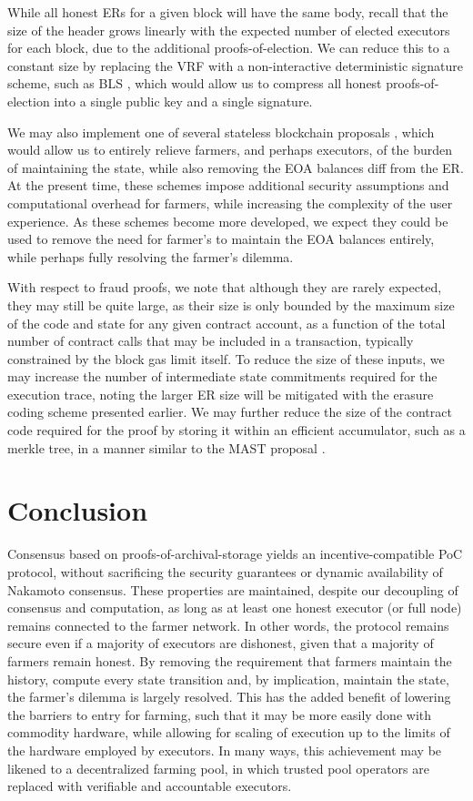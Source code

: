 \documentclass[conference]{IEEEtran}
\begin{document}
While all honest ERs for a given block will have the same body, recall that the size of the header grows linearly with the expected number of elected executors for each block, due to the additional proofs-of-election. We can reduce this to a constant size by replacing the VRF with a non-interactive deterministic signature scheme, such as BLS \cite{boneh2004short}, which would allow us to compress all honest proofs-of-election into a single public key and a single signature.

We may also implement one of several stateless blockchain proposals \cite{boneh2019batching,tomescu2020aggregatable}, which would allow us to entirely relieve farmers, and perhaps executors, of the burden of maintaining the state, while also removing the EOA balances diff from the ER. At the present time, these schemes impose additional security assumptions and computational overhead for farmers, while increasing the complexity of the user experience. As these schemes become more developed, we expect they could be used to remove the need for farmer’s to maintain the EOA balances entirely, while perhaps fully resolving the farmer’s dilemma.

With respect to fraud proofs, we note that although they are rarely expected, they may still be quite large, as their size is only bounded by the maximum size of the code and state for any given contract account, as a function of the total number of contract calls that may be included in a transaction, typically constrained by the block gas limit itself. To reduce the size of these inputs, we may increase the number of intermediate state commitments required for the execution trace, noting the larger ER size will be mitigated with the erasure coding scheme presented earlier. We may further reduce the size of the contract code required for the proof by storing it within an efficient accumulator, such as a merkle tree, in a manner similar to the MAST proposal \cite{rubin2014merkelized}. 

\section{Conclusion}

Consensus based on proofs-of-archival-storage yields an incentive-compatible PoC protocol, without sacrificing the security guarantees or dynamic availability of Nakamoto consensus. These properties are maintained, despite our decoupling of consensus and computation, as long as at least one honest executor (or full node) remains connected to the farmer network. In other words, the protocol remains secure even if a majority of executors are dishonest, given that a majority of farmers remain honest. By removing the requirement that farmers maintain the history, compute every state transition and, by implication, maintain the state, the farmer’s dilemma is largely resolved. This has the added benefit of lowering the barriers to entry for farming, such that it may be more easily done with commodity hardware, while allowing for scaling of execution up to the limits of the hardware employed by executors. In many ways, this achievement may be likened to a decentralized farming pool, in which trusted pool operators are replaced with verifiable and accountable executors. 
\end{document}
